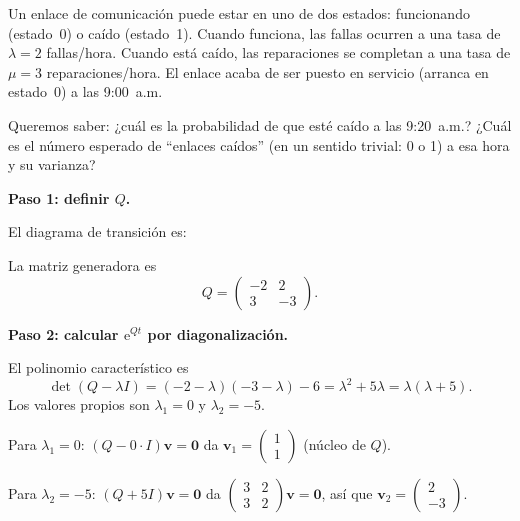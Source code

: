 \documentclass[11pt,a4paper]{article}
\theoremstyle{definition}
\theoremstyle{remark}
\newcommand{\e}{\mathrm{e}}
\begin{document}
\begin{ejemplo}
Un enlace de comunicación puede estar en uno de dos estados: funcionando
(estado~0) o caído (estado~1).  Cuando funciona, las fallas ocurren a
una tasa de $\lambda = 2$ fallas/hora.  Cuando está caído, las
reparaciones se completan a una tasa de $\mu = 3$ reparaciones/hora.  El
enlace acaba de ser puesto en servicio (arranca en estado~0) a las 9:00~a.m.

Queremos saber: ¿cuál es la probabilidad de que esté caído a las
9:20~a.m.?  ¿Cuál es el número esperado de ``enlaces caídos'' (en un
sentido trivial: 0 o 1) a esa hora y su varianza?

\tcblower

\textbf{Paso 1: definir $Q$.}

El diagrama de transición es:

\begin{center}
\end{center}

La matriz generadora es
\[
  Q = \begin{pmatrix} -2 & 2 \\ 3 & -3 \end{pmatrix}.
\]

\textbf{Paso 2: calcular $\e^{Qt}$ por diagonalización.}

El polinomio característico es
\[
  \det(Q-\lambda I) = (-2-\lambda)(-3-\lambda) - 6
  = \lambda^2 + 5\lambda = \lambda(\lambda+5).
\]
Los valores propios son $\lambda_1 = 0$ y $\lambda_2 = -5$.

Para $\lambda_1=0$: $(Q-0\cdot I)\mathbf{v}=\mathbf{0}$ da
$\mathbf{v}_1 = \begin{pmatrix}1\\1\end{pmatrix}$ (núcleo de $Q$).

Para $\lambda_2=-5$: $(Q+5I)\mathbf{v}=\mathbf{0}$ da
$\begin{pmatrix}3&2\\3&2\end{pmatrix}\mathbf{v}=\mathbf{0}$, así que
$\mathbf{v}_2 = \begin{pmatrix}2\\-3\end{pmatrix}$.


\end{ejemplo}
\end{document}
